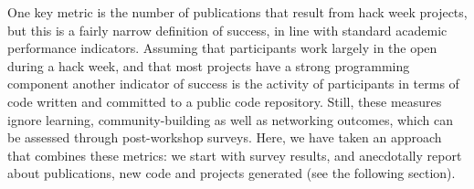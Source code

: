 One key metric is the number of publications that result from hack week projects, but this is a fairly narrow definition of success, in line with standard academic performance indicators.
Assuming that participants work largely in the open during a hack week, and that most projects have a strong programming component another indicator of success is the activity of participants in terms of code written and committed to a public code repository.
Still, these measures ignore learning, community-building as well as networking outcomes, which can be assessed through post-workshop surveys.
Here, we have taken an approach that combines these metrics: we start with survey results, and anecdotally report about publications, new code and projects generated (see the following section).


